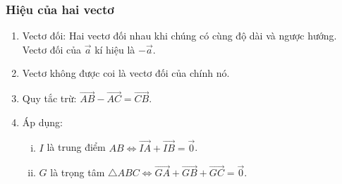 \begin{tomtat}
\subsubsection{Hiệu của hai vectơ}
\begin{enumerate}
\item Vectơ đối: Hai vectơ đối nhau khi chúng có cùng độ dài và ngược hướng. Vectơ đối của $\vec{a}$ kí hiệu là $-\vec{a}$.
\item Vectơ không được coi là vectơ đối của chính nó.
\item Quy tắc trừ: $\vec{AB}-\vec{AC}=\vec{CB}$.
\item Áp dụng:
\begin{enumerate}[i.]
	\item $I$ là trung điểm $AB\Leftrightarrow \vec{IA}+\vec{IB}=\vec{0}$.
	\item $G$ là trọng tâm $\bigtriangleup ABC\Leftrightarrow \vec{GA}+\vec{GB}+\vec{GC}=\vec{0}$.
\end{enumerate}
\end{enumerate}
\end{tomtat}
